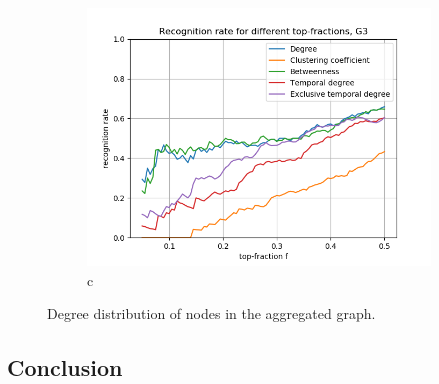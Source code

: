 \documentclass[letterpaper]{article}
\begin{document}
\begin{figure}
\begin{subfigure}[b]{0.32\textwidth}
        \includegraphics[width=\textwidth]{img/rankG3.png}
        \caption{c}
	    \label{fig:degree_distribution_loglog}
    \end{subfigure}
    \caption{Degree distribution of nodes in the aggregated graph.}
    \label{fig:degree_distribution}
\end{figure}




\subsection*{Conclusion}
\todo{}
\end{document}
